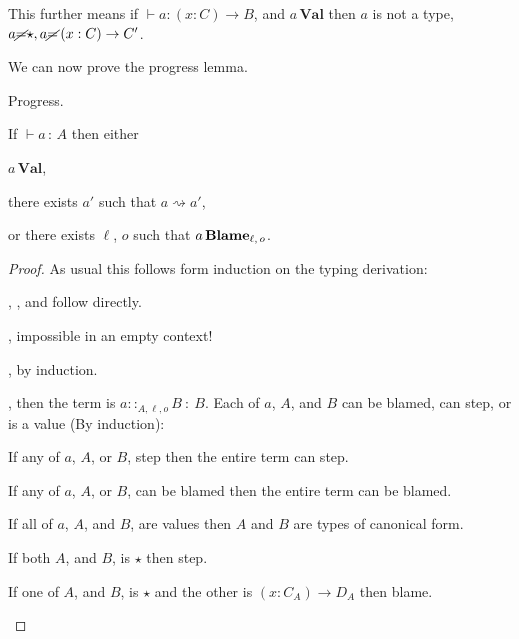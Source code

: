 This further means if $\vdash a:\left(x:C\right)\rightarrow B$, and $a\,\textbf{Val}$ then $a$ is not a type, $a\cancel{=}\star,a\cancel{=}\left(x:C\right)\rightarrow C'$.
 
We can now prove the progress lemma.
 
\begin{thm} Progress.
 
If $\vdash a\,:\,A$ then either
 
$a\,\textbf{Val}$,
 
there exists $a'$ such that $a\rightsquigarrow a'$,
 
or there exists $\ell$, $o$ such that $a\,\textbf{Blame}{}_{\ell,\,o}$.
\end{thm}
\begin{proof}
As usual this follows form induction on the typing derivation:
\begin{casenv}
 \item {}, , and  follow directly.
 \item {}, impossible in an empty context!
 \item {}, by induction.
 \item {}, then the term is $a::_{A,\ell ,o}B\::\:B$.
 Each of $a$, $A$, and $B$ can be blamed, can step, or is a value (By induction):
 \begin{casenv}
   \item If any of $a$, $A$, or $B$, step then the entire term can step.
   \item If any of $a$, $A$, or $B$, can be blamed then the entire term can be blamed.
   \item If all of $a$, $A$, and $B$, are values then $A$ and $B$ are types of canonical form.
   \begin{casenv}
     \item If both $A$, and $B$, is $\star$ then step.
     \item If one of $A$, and $B$, is $\star$ and the other is $\left(x:C_{A}\right)\rightarrow D_{A}$ then blame.
    

\end{casenv}
\end{casenv}
\end{casenv}
\end{proof}
